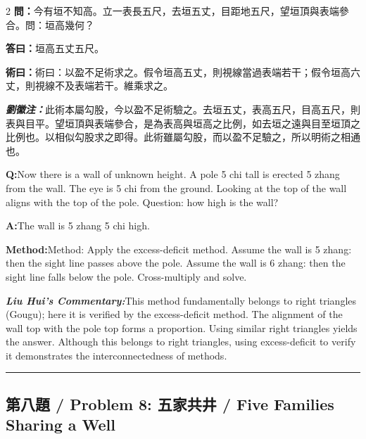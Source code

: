 \documentclass[11pt,a4paper]{article}
\newcommand{\cnwen}{\textcolor{cnlabelfg}{\textbf{問：}}}
\newcommand{\cnda}{\textbf{答曰：}}
\newcommand{\cnshu}{\textcolor{cnlabelfg}{\textbf{術曰：}}}
\newcommand{\cnzhu}{\textcolor{commentarycolor}{\textit{\textbf{劉徽注：}}}}
\newcommand{\enwen}{\textcolor{enlabelfg}{\textbf{Q:}}}
\newcommand{\enda}{\textcolor{enlabelfg}{\textbf{A:}}}
\newcommand{\enshu}{\textcolor{enlabelfg}{\textbf{Method:}}}
\newcommand{\enzhu}{\textcolor{enlabelfg}{\textit{\textbf{Liu Hui's Commentary:}}}}
\begin{document}
\begin{paracol}{2}
\switchcolumn[0]
\cnwen 今有垣不知高。立一表長五尺，去垣五丈，目距地五尺，望垣頂與表端參合。問：垣高幾何？

\cnda 垣高五丈五尺。

\cnshu 術曰：以盈不足術求之。假令垣高五丈，則視線當過表端若干；假令垣高六丈，則視線不及表端若干。維乘求之。

\cnzhu 此術本屬勾股，今以盈不足術驗之。去垣五丈，表高五尺，目高五尺，則表與目平。望垣頂與表端參合，是為表高與垣高之比例，如去垣之遠與目至垣頂之比例也。以相似勾股求之即得。此術雖屬勾股，而以盈不足驗之，所以明術之相通也。

\switchcolumn[1]
\enwen Now there is a wall of unknown height. A pole 5 chi tall is erected 5 zhang from the wall. The eye is 5 chi from the ground. Looking at the top of the wall aligns with the top of the pole. Question: how high is the wall?

\enda The wall is 5 zhang 5 chi high.

\enshu Method: Apply the excess-deficit method. Assume the wall is 5 zhang: then the sight line passes above the pole. Assume the wall is 6 zhang: then the sight line falls below the pole. Cross-multiply and solve.

\enzhu This method fundamentally belongs to right triangles (Gougu); here it is verified by the excess-deficit method. The alignment of the wall top with the pole top forms a proportion. Using similar right triangles yields the answer. Although this belongs to right triangles, using excess-deficit to verify it demonstrates the interconnectedness of methods.
\end{paracol}

\bigskip\hrule\bigskip

\subsection{第八題 / Problem 8: 五家共井 / Five Families Sharing a Well}
\end{document}
